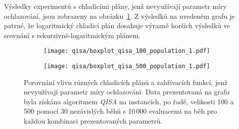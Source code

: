 Výsledky experimentů s chladicími plány, jenž nevyužívají parametr míry ochlazování, jsou zobrazeny na obrázku~\ref{fig:qisa-boxplot}. 
Z výsledků na uvedeném grafu je patrné, že logaritmický chladicí plán dosahuje výrazně horších výsledků ve srovnání s rekurzivně-logaritmickým plánem.

\begin{figure}[ht!]
    \centering
    \begin{subfigure}[b]{0.48\linewidth}
        \texttt{[image: qisa/boxplot\_qisa\_100\_population\_1.pdf]}
    \end{subfigure}
    \hfill
    \begin{subfigure}[b]{0.48\linewidth}
        \texttt{[image: qisa/boxplot\_qisa\_500\_population\_1.pdf]}
    \end{subfigure}
    \caption{Porovnání vlivu různých chladicích plánů a zahřívacích funkcí, jenž nevyužívají parametr míry ochlazování. Data prezentovaná na grafu byla získána algoritmem \emph{QISA} na instancích, po řadě, velikosti 100 a 500 pomocí 30 nezávislých běhů s 10\,000 evaluacemi na běh pro každou kombinaci prezentovaných parametrů.}
    \label{fig:qisa-boxplot}
\end{figure}

